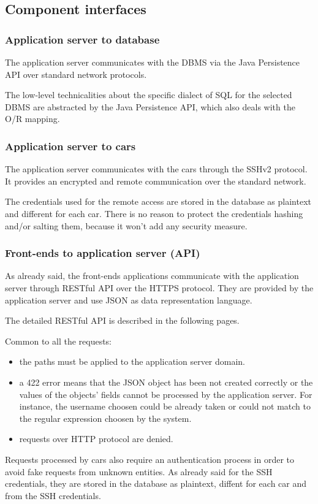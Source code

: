 \subsection{Component interfaces}

\subsubsection{Application server to database}

The application server communicates with the DBMS via the Java Persistence API over standard network protocols.

The low-level technicalities about the specific dialect of SQL for the selected DBMS are abstracted by the Java Persistence API, which also deals with the O/R mapping.

\subsubsection{Application server to cars}

The application server communicates with the cars through the SSHv2 protocol. It provides an encrypted and remote communication over the standard network.

The credentials used for the remote access are stored in the database as plaintext and different for each car. There is no reason to protect the credentials hashing and/or salting them, because it won't add any security measure.

\subsubsection{Front-ends to application server (API)}

As already said, the front-ends applications communicate with the application server through RESTful API over the HTTPS protocol. They are provided by the application server and use JSON as data representation language.

The detailed RESTful API is described in the following pages. 

\bigskip

\noindent Common to all the requests:
\begin{itemize}
	\item the paths must be applied to the application server domain.
	\item a 422 error means that the JSON object has been not created correctly or the values of the objects' fields cannot be processed by the application server. For instance, the username choosen could be already taken or could not match to the regular expression choosen by the system.
	\item requests over HTTP protocol are denied.
\end{itemize}
Requests processed by cars also require an authentication process in order to avoid fake requests from unknown entities. As already said for the SSH credentials, they are stored in the database as plaintext, diffent for each car and from the SSH credentials.




